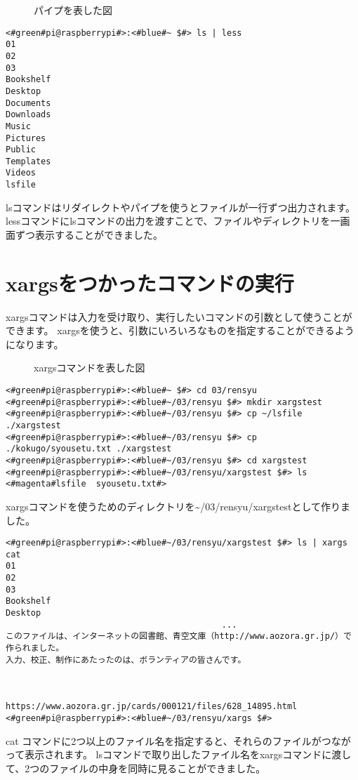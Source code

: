 \begin{figure}[h]
    \centering
    
    \caption{パイプを表した図}
    \label{ch03:pipe}
\end{figure}

\begin{lstlisting}[caption=lsコマンドの出力をパイプでlessコマンドに渡す, label=redirectCat]
<#green#pi@raspberrypi#>:<#blue#~ $#> ls | less
01
02
03
Bookshelf
Desktop
Documents
Downloads
Music
Pictures
Public
Templates
Videos
lsfile
\end{lstlisting}

lsコマンドはリダイレクトやパイプを使うとファイルが一行ずつ出力されます。
lessコマンドにlsコマンドの出力を渡すことで、ファイルやディレクトリを一画面ずつ表示することができました。

\newpage
\section{xargsをつかったコマンドの実行}
xargsコマンドは入力を受け取り、実行したいコマンドの引数として使うことができます。
xargsを使うと、引数にいろいろなものを指定することができるようになります。
\begin{figure}[h]
    \centering
    
    \caption{xargsコマンドを表した図}
    \label{ch03:xargs_command}
\end{figure}
\begin{lstlisting}[caption=xargsコマンドを使う準備をする]
<#green#pi@raspberrypi#>:<#blue#~ $#> cd 03/rensyu
<#green#pi@raspberrypi#>:<#blue#~/03/rensyu $#> mkdir xargstest
<#green#pi@raspberrypi#>:<#blue#~/03/rensyu $#> cp ~/lsfile ./xargstest
<#green#pi@raspberrypi#>:<#blue#~/03/rensyu $#> cp ./kokugo/syousetu.txt ./xargstest
<#green#pi@raspberrypi#>:<#blue#~/03/rensyu $#> cd xargstest
<#green#pi@raspberrypi#>:<#blue#~/03/rensyu/xargstest $#> ls
<#magenta#lsfile  syousetu.txt#>
\end{lstlisting}
xargsコマンドを使うためのディレクトリを\textasciitilde /03/rensyu/xargstestとして作りました。

\newpage
\begin{lstlisting}[caption=xargsコマンドを使ってcatコマンドを使う]
<#green#pi@raspberrypi#>:<#blue#~/03/rensyu/xargstest $#> ls | xargs cat
01
02
03
Bookshelf
Desktop
                                           ...
このファイルは、インターネットの図書館、青空文庫（http://www.aozora.gr.jp/）で作られました。
入力、校正、制作にあたったのは、ボランティアの皆さんです。



https://www.aozora.gr.jp/cards/000121/files/628_14895.html
<#green#pi@raspberrypi#>:<#blue#~/03/rensyu/xargs $#>
\end{lstlisting}
cat コマンドに2つ以上のファイル名を指定すると、それらのファイルがつながって表示されます。
lsコマンドで取り出したファイル名をxargsコマンドに渡して、2つのファイルの中身を同時に見ることができました。

